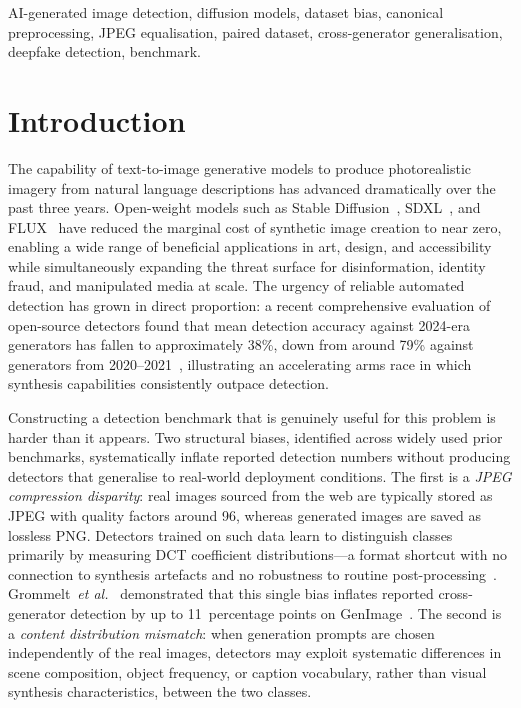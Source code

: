 \documentclass[journal]{IEEEtran}
\newcommand{\etal}{\textit{et al.}}
\begin{document}
\begin{IEEEkeywords}
AI-generated image detection, diffusion models, dataset bias,
canonical preprocessing, JPEG equalisation, paired dataset,
cross-generator generalisation, deepfake detection, benchmark.
\end{IEEEkeywords}

\section{Introduction}
\label{sec:intro}

The capability of text-to-image generative models to produce
photorealistic imagery from natural language descriptions has advanced
dramatically over the past three years.
Open-weight models such as Stable Diffusion~\cite{rombach2022ldm},
SDXL~\cite{podell2024sdxl}, and FLUX~\cite{flux2024bfl} have reduced
the marginal cost of synthetic image creation to near zero, enabling
a wide range of beneficial applications in art, design, and
accessibility while simultaneously expanding the threat surface for
disinformation, identity fraud, and manipulated media at scale.
The urgency of reliable automated detection has grown in direct
proportion: a recent comprehensive evaluation of open-source detectors
found that mean detection accuracy against 2024-era generators has
fallen to approximately 38\%, down from around 79\% against generators
from 2020--2021~\cite{bai2026opendetect}, illustrating an accelerating
arms race in which synthesis capabilities consistently outpace
detection.

Constructing a detection benchmark that is genuinely useful for this
problem is harder than it appears.
Two structural biases, identified across widely used prior benchmarks,
systematically inflate reported detection numbers without producing
detectors that generalise to real-world deployment conditions.
The first is a \emph{JPEG compression disparity}: real images sourced
from the web are typically stored as JPEG with quality factors around
96, whereas generated images are saved as lossless PNG.
Detectors trained on such data learn to distinguish classes primarily
by measuring DCT coefficient distributions---a format shortcut with
no connection to synthesis artefacts and no robustness to routine
post-processing~\cite{grommelt2024jpeg}.
Grommelt~\etal~\cite{grommelt2024jpeg} demonstrated that this
single bias inflates reported cross-generator detection by up to
11~percentage points on GenImage~\cite{zhu2023genimage}.
The second is a \emph{content distribution mismatch}: when generation
prompts are chosen independently of the real images, detectors may
exploit systematic differences in scene composition, object frequency,
or caption vocabulary, rather than visual synthesis characteristics,
between the two classes.
\end{document}
